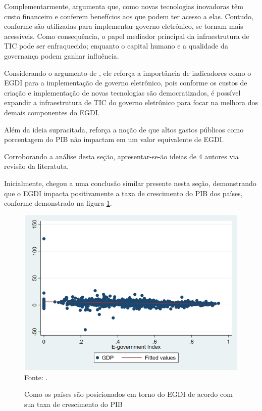 Complementarmente, \cite{singh2007country} argumenta que, como novas tecnologias inovadoras têm custo financeiro e conferem benefícios aos que podem ter acesso a elas. Contudo, conforme são utilizadas para implementar governo eletrônico, se tornam mais acessíveis. Como consequência, o papel mediador principal da infraestrutura de TIC pode ser enfraquecido; enquanto o capital humano e a qualidade da governança podem ganhar influência.

 Considerando o argumento de \cite{singh2007country}, ele reforça a importância de indicadores como o EGDI para a implementação de governo eletrônico, pois conforme os custos de criação e implementação de novas tecnologias são democratizados, é possível expandir a infraestrutura de TIC do governo eletrônico para focar na melhora dos demais componentes do EGDI.

Além da ideia supracitada, \cite{singh2007country} reforça a noção de que altos gastos públicos como porcentagem do PIB não impactam em um valor equivalente de EGDI.

Corroborando a análise desta seção, apresentar-se-ão ideias de 4 autores via revisão da literatuta.

Inicialmente, \cite{alisherovna2021whether} chegou a uma conclusão similar presente nesta seção, demonstrando que o EGDI impacta positivamente a taxa de crescimento do PIB dos países, conforme demonstrado na figura \ref{fig:usmanova_egdi_gdp}.

\begin{figure}[H]
	\centering
	\caption{Como os países são posicionados em torno do EGDI de acordo com sua taxa de crescimento do PIB}
	\includegraphics[width=1\linewidth]{figuras/usmanova_egdi_gdp}
	\label{fig:usmanova_egdi_gdp}
	\footnotesize{Fonte: \cite{alisherovna2021whether}.}
\end{figure}

